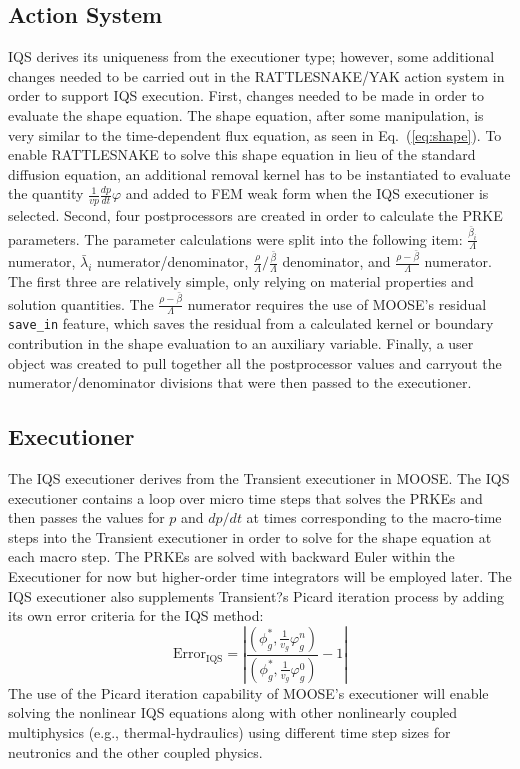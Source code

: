 \documentclass[12pt]{article}
\newcommand{\eqt}[1]{Eq.~(\ref{#1})}                     %
\newcommand{\be}{\begin{equation}}
\newcommand{\ee}{\end{equation}}
\begin{document}
\subsection{Action System}

IQS derives its uniqueness from the executioner type; however, some additional changes needed to be carried out in the RATTLESNAKE/YAK action system in order to support IQS execution.   First, changes needed to be made in order to evaluate the shape equation.  The shape equation, after some manipulation, is very similar to the time-dependent flux equation, as seen in \eqt{eq:shape}.  To enable RATTLESNAKE to solve this shape equation in lieu of the standard diffusion equation, an additional removal kernel has to be instantiated to evaluate the quantity $\frac{1}{vp}\frac{dp}{dt}\varphi$ and added to FEM weak form  when the IQS executioner is selected.  Second, four postprocessors are created in order to calculate the PRKE parameters.  The parameter calculations were split into the following item: $\frac{\bar{\beta}_i}{\Lambda}$ numerator, $\bar{\lambda}_i$ numerator/denominator, $\frac{\rho}{\Lambda}/\frac{\bar{\beta}}{\Lambda}$ denominator, and $\frac{\rho-\bar{\beta}}{\Lambda}$ numerator.  The first three are relatively simple, only relying on material properties and solution quantities.  The $\frac{\rho-\bar{\beta}}{\Lambda}$ numerator requires the use of MOOSE's residual {\tt save\_in} feature, which saves the residual from a calculated kernel or boundary contribution in the shape evaluation to an auxiliary variable.  Finally, a user object was created to pull together all the postprocessor values and carryout the numerator/denominator divisions that were then passed to the executioner.

\subsection{Executioner}

The IQS executioner derives from the Transient executioner in MOOSE.  The IQS executioner contains a loop over micro time steps that solves the PRKEs and then passes the values for $p$ and $dp/dt$ at times corresponding to the macro-time steps into the Transient executioner in order to solve for the shape equation at each macro step.  The PRKEs are solved with backward Euler within the Executioner for now but higher-order time integrators will be employed later.  The IQS executioner also supplements Transient?s Picard iteration process by adding its own error criteria for the IQS method: 
\be
\text{Error}_{\text{IQS}}=\left|\frac{\left(\phi^*_g,\frac{1}{v_g}\varphi_g^n\right)}{\left(\phi_g^*,\frac{1}{v_g}\varphi_g^0\right)}-1\right|
\ee
The use of the Picard iteration capability of MOOSE's executioner will enable solving the nonlinear IQS equations along with other nonlinearly coupled multiphysics (e.g., thermal-hydraulics) using different time step sizes for neutronics and the other coupled physics. 
\end{document}
